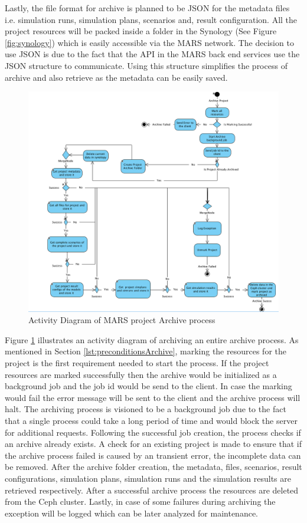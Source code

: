     Lastly, the file format for archive is planned to be JSON for the metadata files i.e. simulation runs, simulation plans, scenarios and, result configuration. All the project resources will be packed inside a folder in the Synology (See Figure \ref{fig:synology})
    which is easily accessible via the MARS network. The decision to use JSON is due to the fact that the API in the MARS back end services 
    use the JSON structure to communicate. Using this structure simplifies the process of archive and also retrieve as the metadata can be easily saved.
\begin{figure}[H]
    \centering \includegraphics[scale=0.45]{grafiken/archiveActivity.png}
    \caption{Activity Diagram of MARS project Archive process}
    \label{fig:archiveActivity}
\end{figure}

Figure \ref{fig:archiveActivity} illustrates an activity diagram of archiving an entire archive process. As mentioned in Section \ref{lst:preconditionsArchive},
marking the resources for the project is the first requirement needed to start the process. If the project resources are marked successfully
then the archive would be initialized as a background job and the job id would be send to the client. In case the marking would fail the error message will be 
sent to the client and the archive process will halt. The archiving process is visioned to be a background job due to the fact that a single process could take
a long period of time and would block the server for additional requests. Following the successful job creation, the process checks if an archive already
exists. A check for an existing project is made to ensure that if the archive process failed is caused by an transient error, the incomplete data can be removed. After
the archive folder creation, the metadata, files, scenarios, result configurations, simulation plans, simulation runs and the simulation results are retrieved respectively.
After a successful archive process the  resources are deleted from the Ceph cluster. Lastly, in case of some failures during archiving the exception will be logged 
which can be later analyzed for maintenance.

